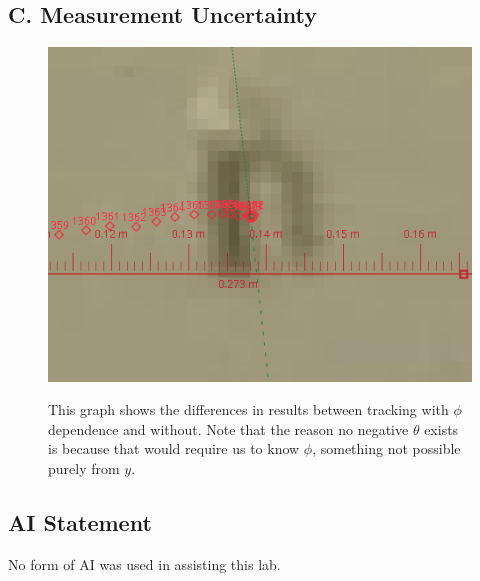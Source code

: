 \documentclass[prl,twocolumn,amsmath,amssymb,superscriptaddress]{revtex4-2}
\begin{document}
\subsection{C. Measurement Uncertainty}

\begin{figure}[htb]
    \includegraphics[width=0.3\linewidth]{pendulum-body.png}
    \label{fig:body}
    \caption{This graph shows the differences in results between tracking with $\phi$ dependence and without. Note that the reason no negative $\theta$ exists is because that would require us to know $\phi$, something not possible purely from $y$.}
\end{figure}

\newpage
\subsection{AI Statement}

No form of AI was used in assisting this lab.
\end{document}
